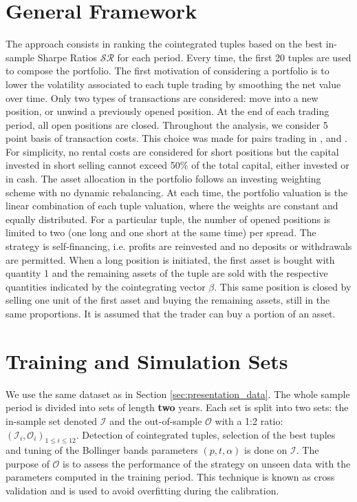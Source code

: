\documentclass[11pt,a4,twosided,singlespacing,titlepagenumber=on]{scrreprt}
\numberwithin{equation}{chapter} %
\theoremstyle{remark}
\begin{document}
\section{General Framework}

The approach consists in ranking the cointegrated tuples based on the best in-sample Sharpe Ratios $\mathcal{SR}$ for each period. Every time, the first 20 tuples are used to compose the portfolio. The first motivation of considering a portfolio is to lower the volatility associated to each tuple trading by smoothing the net value over time. Only two types of transactions are considered: move into a new position, or unwind a previously opened position. At the end of each trading period, all open positions are closed. Throughout the analysis, we consider 5 point basis of transaction costs. This choice was made for pairs trading in \cite{dunis2010}, \cite{dunis2005} and \cite{alexander2002}. For simplicity, no rental costs are considered for short positions but the capital invested in short selling cannot exceed 50\% of the total capital, either invested or in cash. The asset allocation in the portfolio follows an investing weighting scheme with no dynamic rebalancing. At each time, the portfolio valuation is the linear combination of each tuple valuation, where the weights are constant and equally distributed. For a particular tuple, the number of opened positions is limited to two (one long and one short at the same time) per spread. The strategy is self-financing, i.e. profits are reinvested and no deposits or withdrawals are permitted. When a long position is initiated, the first asset is bought with quantity 1 and the remaining assets of the tuple are sold with the respective quantities indicated by the cointegrating vector $\beta$. This same position is closed by selling one unit of the first asset and buying the remaining assets, still in the same proportions. It is assumed that the trader can buy a portion of an asset. \\

\section{Training and Simulation Sets}
We use the same dataset as in Section \ref{sec:presentation_data}. The whole sample period is divided into sets of length \textbf{two} years. Each set is split into two sets: the in-sample set denoted $\mathcal{I}$ and the out-of-sample $\mathcal{O}$ with a 1:2 ratio: $(\mathcal{I}_i, \mathcal{O}_i)_{1 \leq i \leq 12}$. Detection of cointegrated tuples, selection of the best tuples and tuning of the Bollinger bands parameters $(p,t,\alpha)$ is done on $\mathcal{I}$. The purpose of $\mathcal{O}$ is to assess the performance of the strategy on unseen data with the parameters computed in the training period. This technique is known as cross validation and is used to avoid overfitting during the calibration. 
\end{document}
